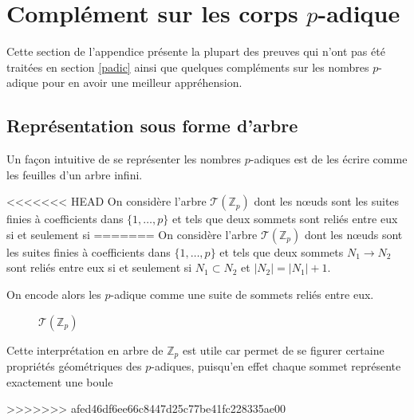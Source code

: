 \section{Complément sur les corps \texorpdfstring{$p$}{p}-adique}
\label{cpadic}

Cette section de l'appendice présente la plupart des preuves qui n'ont pas été traitées en section \ref{padic} ainsi que quelques compléments sur les nombres $p$-adique pour en avoir une meilleur appréhension.


\subsection*{Représentation sous forme d'arbre}
Un façon intuitive de se représenter les nombres $p$-adiques est de les écrire comme les feuilles d'un arbre infini.

<<<<<<< HEAD
On considère l'arbre $\mathcal{T}(\mathbb{Z}_p)$ dont les nœuds sont les suites finies à coefficients dans $\{1,\ldots,p\} $ et tels que deux sommets sont reliés entre eux si et seulement si 
=======
On considère l'arbre $\mathcal{T}(\mathbb{Z}_p)$ dont les nœuds sont les suites finies à coefficients dans $\{1,\ldots,p\} $ et tels que deux sommets $N_1 \to N_2$ sont reliés entre eux si et seulement si $N_1 \subset N_2$ et $|N_2| = |N_1| + 1$. 

On encode alors les $p$-adique comme une suite de sommets reliés entre eux.


\begin{figure}[htpb]
	\centering
	 
	\caption{$\mathcal{T}\left( \mathbb{Z}_p \right) $}
	\label{fig:TZp} 
\end{figure}



Cette interprétation en arbre de $\mathbb{Z}_p$ est utile car permet de se figurer certaine propriétés géométriques des $p$-adiques, puisqu'en effet chaque sommet représente exactement une boule 

>>>>>>> afed46df6ee66c8447d25c77be41fc228335ae00

